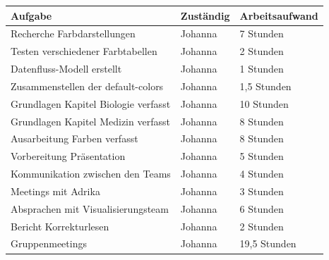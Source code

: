 \documentclass[12pt]{article}
\begin{document}
\begin{table}[H]
	\centering
	\begin{tabular}{l|l|l}
		Aufgabe                       & Zuständig & Arbeitsaufwand \\ 
		\hline
		Recherche Farbdarstellungen             & Johanna   & 7 Stunden               \\
		Testen verschiedener Farbtabellen     & Johanna   & 2 Stunden               \\ 
		Datenfluss-Modell erstellt     	& Johanna   & 1 Stunden               \\
		Zusammenstellen der default-colors             & Johanna   & 1,5 Stunden      \\ 
		Grundlagen Kapitel Biologie verfasst              & Johanna   & 10 Stunden               \\ 
		Grundlagen Kapitel Medizin  verfasst              & Johanna   & 8 Stunden               \\ 
		Ausarbeitung Farben verfasst              & Johanna   & 8 Stunden               \\
		Vorbereitung Präsentation              & Johanna   & 5 Stunden               \\
		Kommunikation zwischen den Teams   & Johanna   & 4 Stunden      \\ 
		Meetings mit Adrika                & Johanna   & 3 Stunden    \\ 
		Absprachen mit Visualisierungsteam                & Johanna   & 6 Stunden    \\ 
		Bericht Korrekturlesen               & Johanna   & 2 Stunden    \\ 
		Gruppenmeetings                & Johanna   & 19,5 Stunden    \\ 
	\end{tabular}
\end{table}

\newpage
\pagestyle{fancy}
\fancyhead{}

\end{document}
